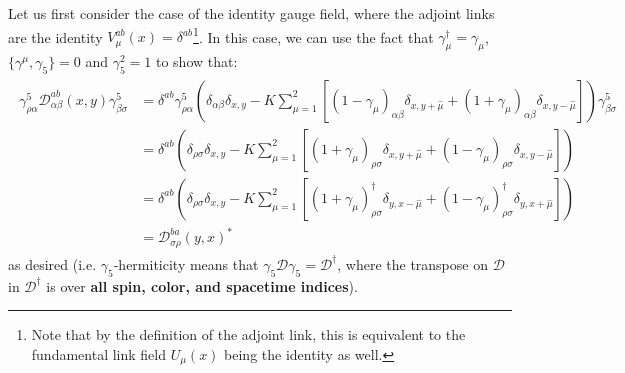 Let us first consider the case of the identity gauge field, where the adjoint links are the identity $V_\mu^{ab}(x) = \delta^{ab}$\footnote{Note that by the definition of the adjoint link, this is equivalent to the fundamental link field $U_\mu(x)$ being the identity as well.}. In this case, we can use the fact that $\gamma_\mu^\dagger = \gamma_\mu$, $\{\gamma^\mu, \gamma_5\} = 0$ and $\gamma_5^2 = 1$ to show that:
\begin{align}\begin{split}
	\gamma^5_{\rho\alpha} \mathcal D_{\alpha\beta}^{ab}(x, y) \gamma^5_{\beta \sigma} &= \delta^{ab} \gamma^5_{\rho\alpha} \left( \delta_{\alpha\beta} \delta_{x, y} - K \sum_{\mu = 1}^2 \left[ (1 - \gamma_\mu)_{\alpha\beta} \delta_{x, y + \hat\mu} + (1 + \gamma_\mu)_{\alpha\beta} \delta_{x, y - \hat\mu} \right] \right) \gamma^5_{\beta \sigma} \\
	&= \delta^{ab} \left( \delta_{\rho\sigma} \delta_{x, y} - K\sum_{\mu = 1}^2 \left[ (1 + \gamma_\mu)_{\rho\sigma} \delta_{x, y + \hat\mu} + (1 - \gamma_\mu)_{\rho\sigma} \delta_{x, y - \hat\mu} \right] \right) \\
	&= \delta^{ab} \left( \delta_{\rho\sigma} \delta_{x, y} - K\sum_{\mu = 1}^2 \left[ (1 + \gamma_\mu)_{\rho\sigma}^\dagger \delta_{y, x - \hat\mu} + (1 - \gamma_\mu)_{\rho\sigma}^\dagger \delta_{y, x + \hat\mu} \right] \right) \\
	&= \mathcal D_{\sigma\rho}^{ba}(y, x)^*
\end{split}\end{align}
as desired (i.e. $\gamma_5$-hermiticity means that $\gamma_5 \mathcal D \gamma_5 = \mathcal D^\dagger$, where the transpose on $\mathcal D$ in $\mathcal D^\dagger$ is over \textbf{all spin, color, and spacetime indices}). 

